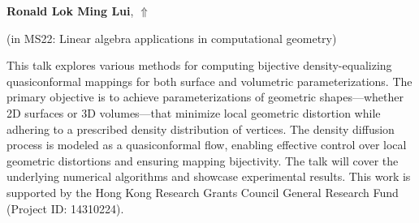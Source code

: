\documentclass[ILAS2025-program.tex]{subfiles}
\begin{document}
     \hypertarget{down0035}{}\begin{ilasabstract}
    
    \textbf{Ronald Lok Ming Lui},  \hfill \hyperlink{up0035}{$\Uparrow$}
    
    (in {\color{mstitle}MS22: Linear algebra applications in computational geometry})
        
        \mtskip
    This talk explores various methods for computing bijective density-equalizing quasiconformal mappings for both surface and volumetric parameterizations. The primary objective is to achieve parameterizations of geometric shapes—whether 2D surfaces or 3D volumes—that minimize local geometric distortion while adhering to a prescribed density distribution of vertices. The density diffusion process is modeled as a quasiconformal flow, enabling effective control over local geometric distortions and ensuring mapping bijectivity. The talk will cover the underlying numerical algorithms and showcase experimental results. This work is supported by the Hong Kong Research Grants Council General Research Fund (Project ID: 14310224).
\end{ilasabstract}
\end{document}
